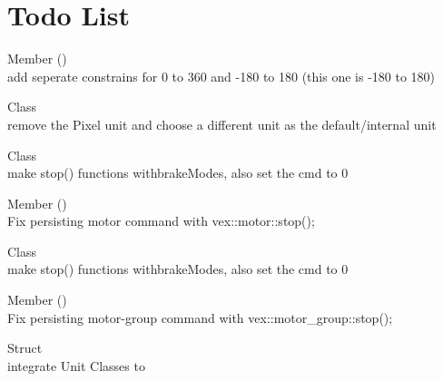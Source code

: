 \chapter{Todo List}
\hypertarget{todo}{}\label{todo}

\begin{DoxyRefList}
\item[Member \doxylink{classart_1_1_angle_ace8d0ebeae58b407fca15f951816e578}{art\+::Angle\+::constrain} ()]\hfill \\
\label{todo__todo000006}%
%
add seperate constrains for 0 to 360 and -\/180 to 180 (this one is -\/180 to 180)  
\item[Class \doxylink{classart_1_1_length}{art\+::Length} ]\hfill \\
\label{todo__todo000005}%
%
remove the Pixel unit and choose a different unit as the default/internal unit  
\item[Class \doxylink{classart_1_1_simple_motor}{art\+::Simple\+Motor} ]\hfill \\
\label{todo__todo000001}%
%
make stop() functions withbrake\+Modes, also set the cmd to 0  
\item[Member \doxylink{classart_1_1_simple_motor_aa3d8f01a6a434cdb8d6559dfe7b8d642}{art\+::Simple\+Motor\+::get} ()]\hfill \\
\label{todo__todo000002}%
%
Fix persisting motor command with vex\+::motor\+::stop(); 
\item[Class \doxylink{classart_1_1_simple_motor_group}{art\+::Simple\+Motor\+Group} ]\hfill \\
\label{todo__todo000003}%
%
make stop() functions withbrake\+Modes, also set the cmd to 0  
\item[Member \doxylink{classart_1_1_simple_motor_group_ae7e407ee8ae8e4c8456606cc1fcedf47}{art\+::Simple\+Motor\+Group\+::get} ()]\hfill \\
\label{todo__todo000004}%
%
Fix persisting motor-\/group command with vex\+::motor\+\_\+group\+::stop(); 
\item[Struct \doxylink{structart_1_1_vec2}{art\+::Vec2} ]\hfill \\
\label{todo__todo000007}%
%
integrate Unit Classes to  
\end{DoxyRefList}